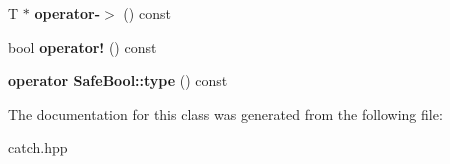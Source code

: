 \begin{DoxyCompactItemize}
\item 
T $\ast$ {\bfseries operator-\/$>$} () const \hypertarget{classCatch_1_1Ptr_afaa13250d5e0ae5a440726d5e5aa7295}{}\label{classCatch_1_1Ptr_afaa13250d5e0ae5a440726d5e5aa7295}

\item 
bool {\bfseries operator!} () const \hypertarget{classCatch_1_1Ptr_aea1a99ded6d62423ccb9173fab91b56e}{}\label{classCatch_1_1Ptr_aea1a99ded6d62423ccb9173fab91b56e}

\item 
{\bfseries operator Safe\+Bool\+::type} () const \hypertarget{classCatch_1_1Ptr_a27234c04feec43ffe0fd08e045557448}{}\label{classCatch_1_1Ptr_a27234c04feec43ffe0fd08e045557448}

\end{DoxyCompactItemize}


The documentation for this class was generated from the following file\+:\begin{DoxyCompactItemize}
\item 
catch.\+hpp\end{DoxyCompactItemize}
